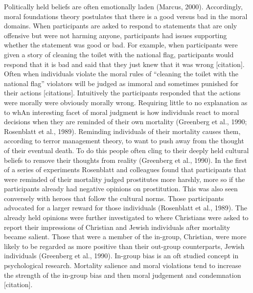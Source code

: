 \documentclass[
  donotrepeattitle,doc, 12pt, a4paper,floatsintext]{apa7}
\begin{document}
Politically held beliefs are often emotionally laden (Marcus, 2000). Accordingly, moral foundations theory postulates that there is a good versus bad in the moral domains. When participants are asked to respond to statements that are only offensive but were not harming anyone, participants had issues supporting whether the statement was good or bad. For example, when participants were given a story of cleaning the toilet with the national flag, participants would respond that it is bad and said that they just knew that it was wrong {[}citation{]}. Often when individuals violate the moral rules of ``cleaning the toilet with the national flag'' violators will be judged as immoral and sometimes punished for their actions {[}citations{]}. Intuitively the participants responded that the actions were morally were obviously morally wrong. Requiring little to no explanation as to whAn interesting facet of moral judgment is how individuals react to moral decisions when they are reminded of their own mortality (Greenberg et al., 1990; Rosenblatt et al., 1989). Reminding individuals of their mortality causes them, according to terror management theory, to want to push away from the thought of their eventual death. To do this people often cling to their deeply held cultural beliefs to remove their thoughts from reality (Greenberg et al., 1990). In the first of a series of experiments Rosenblatt and colleagues found that participants that were reminded of their mortality judged prostitutes more harshly, more so if the participants already had negative opinions on prostitution. This was also seen conversely with heroes that follow the cultural norms. Those participants advocated for a larger reward for those individuals (Rosenblatt et al., 1989). The already held opinions were further investigated to where Christians were asked to report their impressions of Christian and Jewish individuals after mortality became salient. Those that were a member of the in-group, Christian, were more likely to be regarded as more positive than their out-group counterparts, Jewish individuals (Greenberg et al., 1990). In-group bias is an oft studied concept in psychological research. Mortality salience and moral violations tend to increase the strength of the in-group bias and then moral judgement and condemnation {[}citation{]}.
\end{document}
